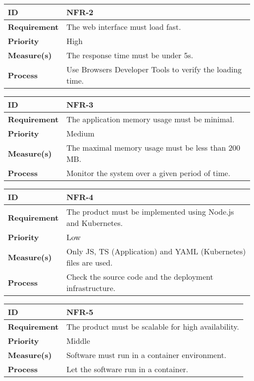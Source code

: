 \begin{center}
\begin{tabular}{ | m{8em} | m{25em}| } 
 \hline
 \textbf{ID} & NFR-2\\ 
 \hline
 \textbf{Requirement} & The web interface must load fast.\\
 \hline
 \textbf{Priority} & High\\
 \hline
 \textbf{Measure(s)} & The response time must be under 5s.\\
 \hline
 \textbf{Process} & Use Browsers Developer Tools to verify the loading time.\\
 \hline
\end{tabular}
\end{center}

\begin{center}
\begin{tabular}{ | m{8em} | m{25em}| } 
 \hline
 \textbf{ID} & NFR-3\\ 
 \hline
 \textbf{Requirement} & The application memory usage must be minimal.\\
 \hline
 \textbf{Priority} & Medium\\
 \hline
 \textbf{Measure(s)} & The maximal memory usage must be less than 200 MB.\\
 \hline
 \textbf{Process} & Monitor the system over a given period of time.\\
 \hline
\end{tabular}
\end{center}

\begin{center}
\begin{tabular}{ | m{8em} | m{25em}| } 
 \hline
 \textbf{ID} & NFR-4\\ 
 \hline
 \textbf{Requirement} & The product must be implemented using Node.js and Kubernetes.\\
 \hline
 \textbf{Priority} & Low\\
 \hline
 \textbf{Measure(s)} & Only JS, TS (Application) and YAML (Kubernetes) files are used.\\
 \hline
 \textbf{Process} & Check the source code and the deployment infrastructure.\\
 \hline
\end{tabular}
\end{center}

\begin{center}
\begin{tabular}{ | m{8em} | m{25em}| } 
 \hline
 \textbf{ID} & NFR-5\\ 
 \hline
 \textbf{Requirement} & The product must be scalable for high availability.\\
 \hline
 \textbf{Priority} & Middle\\
 \hline
 \textbf{Measure(s)} & Software must run in a container environment.\\
 \hline
 \textbf{Process} & Let the software run in a container.\\
 \hline
\end{tabular}
\end{center}

